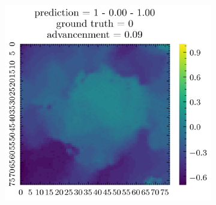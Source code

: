\begin{figure}[H]
\begin{subfigure}[b]{0.19\textwidth}
    \end{subfigure}  
    \begin{subfigure}[b]{0.19\textwidth}
        \includegraphics[width=\linewidth]{../img/5/quarry/false_negative/patch-2d-4.png}
    \end{subfigure}  


\end{figure}
